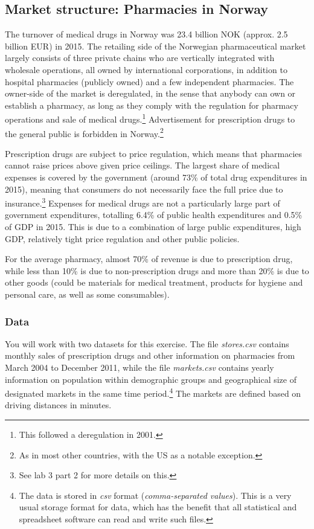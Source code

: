 \documentclass[12pt,a4paper]{article}
\begin{document}
\subsection*{Market structure: Pharmacies in Norway}
The turnover of medical drugs in Norway was 23.4 billion NOK (approx. 2.5 billion EUR) in 2015. The retailing side of the Norwegian pharmaceutical market largely consists of three private chains who are vertically integrated with wholesale operations, all owned by international corporations, in addition to hospital pharmacies (publicly owned) and a few independent pharmacies. The owner-side of the market is deregulated, in the sense that anybody can own or establish a pharmacy, as long as they comply with the regulation for pharmacy operations and sale of medical drugs.\footnote{This followed a deregulation in 2001.} Advertisement for prescription drugs to the general public is forbidden in Norway.\footnote{As in most other countries, with the US as a notable exception.}

Prescription drugs are subject to price regulation, which means that pharmacies cannot raise prices above given price ceilings. The largest share of medical expenses is covered by the government (around 73\% of total drug expenditures in 2015), meaning that consumers do not necessarily face the full price due to insurance.\footnote{See lab 3 part 2 for more details on this.} Expenses for medical drugs are not a particularly large part of government expenditures, totalling 6.4\% of public health expenditures and 0.5\% of GDP in 2015. This is due to a combination of large public expenditures, high GDP, relatively tight price regulation and other public policies.

For the average pharmacy, almost 70\% of revenue is due to prescription drug, while less than 10\% is due to non-prescription drugs and more than 20\% is due to other goods (could be materials for medical treatment, products for hygiene and personal care, as well as some consumables).

\pagebreak

\subsubsection*{Data}
You will work with two datasets for this exercise. The file \emph{stores.csv} contains monthly sales of prescription drugs and other information on pharmacies from March 2004 to December 2011, while the file \emph{markets.csv} contains yearly information on population within demographic groups and geographical size of designated markets in the same time period.\footnote{The data is stored in \emph{csv} format (\emph{comma-separated values}). This is a very usual storage format for data, which has the benefit that all statistical and spreadsheet software can read and write such files.} The markets are defined based on driving distances in minutes.
\end{document}
